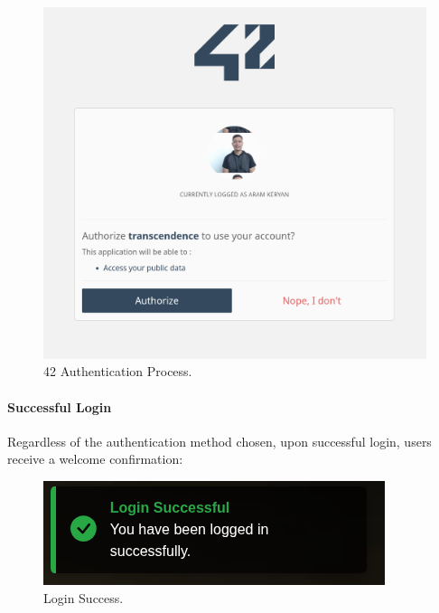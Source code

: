 \begin{figure}[H]
    \centering
    \includegraphics[width=0.6\linewidth]{Figures/images/new_images/42Authentication.png}
    \caption{42 Authentication Process.} %
    \label{fig:42-auth-process}
\end{figure}

\paragraph{Successful Login} Regardless of the authentication method chosen, upon successful login, users receive a welcome confirmation:

\begin{figure}[H]
    \centering
    \includegraphics[width=0.6\linewidth]{Figures/images/new_images/LoginSuccessfully.png}
    \caption{Login Success.} %
    \label{fig:login-success-wireframe}
\end{figure}

